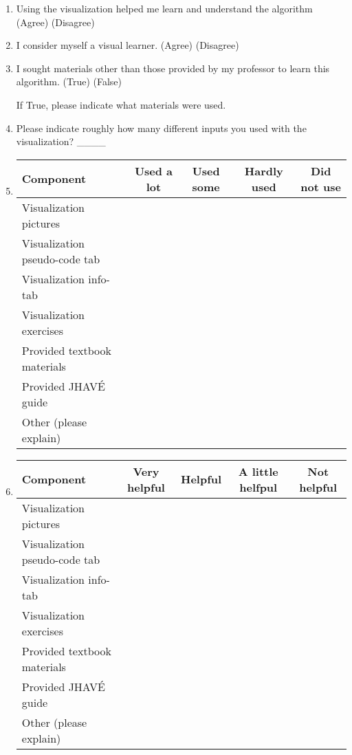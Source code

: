 \documentclass{article}
\begin{document}
\begin{enumerate}

\item Using the visualization helped me learn and understand the algorithm (Agree) (Disagree)

\item I consider myself a visual learner.
(Agree) (Disagree)

\item I sought materials other than those provided by my professor to learn this algorithm.
(True) (False)

If True, please indicate what materials were used.

\item Please indicate roughly how many different inputs you used with the visualization? \_\_\_\_

\item
\begin{tabular}{| l | c | c | c | c |}
\hline
\textbf{Component} & \textbf{Used a lot} & \textbf{Used some} & \textbf{Hardly used} & \textbf{Did not use} \\
\hline
Visualization pictures &&&& \\
\hline
Visualization pseudo-code tab &&&& \\
\hline
Visualization info-tab &&&& \\
\hline
Visualization exercises &&&& \\
\hline
Provided textbook materials &&&& \\
\hline
Provided JHAVÉ guide &&&& \\
\hline
Other (please explain) &&&& \\
\hline
\end{tabular}

\item
\begin{tabular}{| l | c | c | c | c |}
\hline
\textbf{Component} & \textbf{Very helpful} & \textbf{Helpful} & \textbf{A little helfpul} & \textbf{Not helpful} \\
\hline
Visualization pictures &&&& \\
\hline
Visualization pseudo-code tab &&&& \\
\hline
Visualization info-tab &&&& \\
\hline
Visualization exercises &&&& \\
\hline
Provided textbook materials &&&& \\
\hline
Provided JHAVÉ guide &&&& \\
\hline
Other (please explain) &&&& \\
\hline
\end{tabular}


\end{enumerate}
\end{document}
